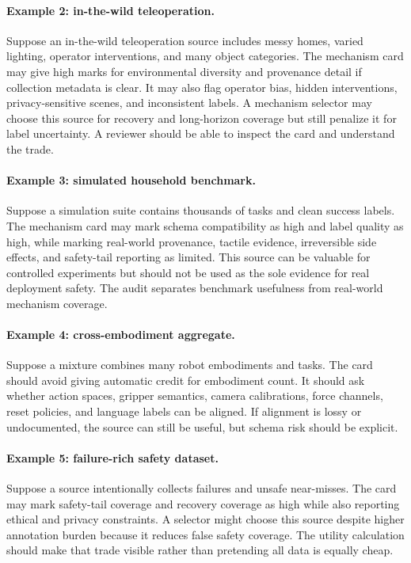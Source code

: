 \documentclass{article}
\begin{document}
\paragraph{Example 2: in-the-wild teleoperation.}
Suppose an in-the-wild teleoperation source includes messy homes, varied lighting, operator interventions, and many object categories. The mechanism card may give high marks for environmental diversity and provenance detail if collection metadata is clear. It may also flag operator bias, hidden interventions, privacy-sensitive scenes, and inconsistent labels. A mechanism selector may choose this source for recovery and long-horizon coverage but still penalize it for label uncertainty. A reviewer should be able to inspect the card and understand the trade.

\paragraph{Example 3: simulated household benchmark.}
Suppose a simulation suite contains thousands of tasks and clean success labels. The mechanism card may mark schema compatibility as high and label quality as high, while marking real-world provenance, tactile evidence, irreversible side effects, and safety-tail reporting as limited. This source can be valuable for controlled experiments but should not be used as the sole evidence for real deployment safety. The audit separates benchmark usefulness from real-world mechanism coverage.

\paragraph{Example 4: cross-embodiment aggregate.}
Suppose a mixture combines many robot embodiments and tasks. The card should avoid giving automatic credit for embodiment count. It should ask whether action spaces, gripper semantics, camera calibrations, force channels, reset policies, and language labels can be aligned. If alignment is lossy or undocumented, the source can still be useful, but schema risk should be explicit.

\paragraph{Example 5: failure-rich safety dataset.}
Suppose a source intentionally collects failures and unsafe near-misses. The card may mark safety-tail coverage and recovery coverage as high while also reporting ethical and privacy constraints. A selector might choose this source despite higher annotation burden because it reduces false safety coverage. The utility calculation should make that trade visible rather than pretending all data is equally cheap.
\end{document}
